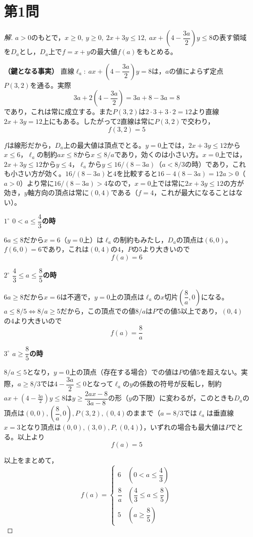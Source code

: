\documentclass[../main.tex]{subfiles}
\begin{document}
\section*{第1問}

\begin{proof}[解]
  $a>0$のもとで，$x\ge0,\ y\ge0,\ 2x+3y\le12,\ ax+\left(4-\dfrac{3a}2\right)y\le8$の表す領域を$D_a$とし，$D_a$上で$f=x+y$の最大値$f(a)$をもとめる。

  \textbf{（鍵となる事実）} 直線$\ell_a:\ ax+\left(4-\dfrac{3a}2\right)y=8$は，$a$の値によらず定点$P(3,2)$を通る。実際
  \[
    3a+2\left(4-\frac{3a}2\right)=3a+8-3a=8
  \]
  であり，これは常に成立する。また$P(3,2)$は$2\cdot3+3\cdot2=12$より直線$2x+3y=12$上にもある。したがって2直線は常に$P(3,2)$で交わり，
  \[
    f(3,2)=5
  \]

  $f$は線形だから，$D_a$上の最大値は頂点でとる。$y=0$上では，$2x+3y\le12$から$x\le6$，$\ell_a$の制約$ax\le8$から$x\le8/a$であり，効くのは小さい方。$x=0$上では，$2x+3y\le12$から$y\le4$，$\ell_a$から$y\le16/(8-3a)$（$a<8/3$の時）であり，これも小さい方が効く。$16/(8-3a)$と$4$を比較すると$16-4(8-3a)=12a>0$（$a>0$）より常に$16/(8-3a)>4$なので，$x=0$上では常に$2x+3y\le12$の方が効き，$y$軸方向の頂点は常に$(0,4)$である（$f=4$，これが最大になることはない）。

  \textbf{$1^\circ$ $0<a\le\dfrac43$の時}

  $6a\le8$だから$x=6$（$y=0$上）は$\ell_a$の制約もみたし，$D_a$の頂点は$(6,0)$。$f(6,0)=6$であり，これは$(0,4)$の$4$，$P$の$5$より大きいので
  \[
    f(a)=6
  \]

  \textbf{$2^\circ$ $\dfrac43\le a\le\dfrac85$の時}

  $6a\ge8$だから$x=6$は不適で，$y=0$上の頂点は$\ell_a$の$x$切片$\left(\dfrac8a,0\right)$になる。$a\le8/5\iff8/a\ge5$だから，この頂点での値$8/a$は$P$での値$5$以上であり，$(0,4)$の$4$より大きいので
  \[
    f(a)=\frac8a
  \]

  \textbf{$3^\circ$ $a\ge\dfrac85$の時}

  $8/a\le5$となり，$y=0$上の頂点（存在する場合）での値は$P$の値$5$を超えない。実際，$a\ge8/3$では$4-\dfrac{3a}2\le0$となって$\ell_a$の$y$の係数の符号が反転し，制約$ax+(4-\tfrac{3a}2)y\le8$は$y\ge\dfrac{2ax-8}{3a-8}$の形（$y$の下限）に変わるが，このときも$D_a$の頂点は$(0,0),\left(\dfrac8a,0\right),P(3,2),(0,4)$のままで（$a=8/3$では$\ell_a$は垂直線$x=3$となり頂点は$(0,0),(3,0),P,(0,4)$），いずれの場合も最大値は$P$でとる。以上より
  \[
    f(a)=5
  \]

  以上をまとめて，
  \[
    f(a)=
    \begin{cases}
      6 & \left(0<a\le\dfrac43\right)\\[2mm]
      \dfrac8a & \left(\dfrac43\le a\le\dfrac85\right)\\[2mm]
      5 & \left(a\ge\dfrac85\right)
    \end{cases}
  \]


\end{proof}
\end{document}

